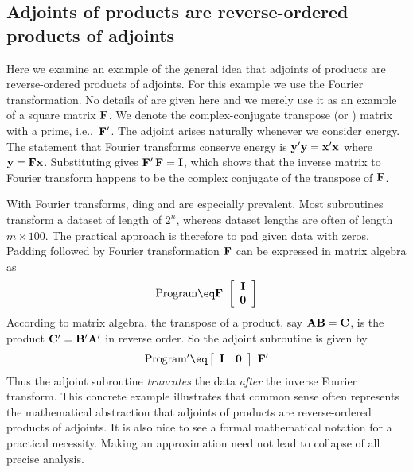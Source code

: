 \subsection{Adjoints of products are reverse-ordered products of adjoints}
Here we examine an example of the general idea that
adjoints of products are reverse-ordered products of adjoints.
For this example we use the Fourier transformation.
No details of  are given here
and we merely use it as an example of a square matrix $\bold F$.
We denote the complex-conjugate transpose (or ) matrix
with a prime,
i.e.,~$\bold F'$.
The adjoint arises naturally whenever we consider energy.
The statement that Fourier transforms conserve energy is
$\bold y'\bold y=\bold x'\bold x$ where $\bold y= \bold F \bold x$.
Substituting gives $\bold F'\, \bold F = \bold I$, which shows that
the inverse matrix to Fourier transform
happens to be the complex conjugate of the transpose of $\bold F$.
\par
With Fourier transforms,
ding and  are especially prevalent.
Most subroutines transform a dataset of length of $2^n$,
whereas dataset lengths are often of length $m \times 100$.
The practical approach is therefore to pad given data with zeros.
Padding followed by Fourier transformation $\bold F$
can be expressed in matrix algebra as
\begin{equation}
{\rm Program} \eq
\bold F \
 \left[
  \begin{array}{c}
   \bold I \\
   \bold 0
  \end{array}
 \right]
\end{equation}
According to matrix algebra, the transpose of a product,
say $\bold A \bold B = \bold C$,
is the product $\bold C' = \bold B' \bold A'$ in reverse order.
So the adjoint subroutine is given by
\begin{equation}
{\rm Program'} \eq
 \left[
  \begin{array}{cc}
   \bold I & \bold 0
  \end{array}
 \right]
\
\bold F'
\end{equation}
Thus the adjoint subroutine
{\it truncates} the data {\it after} the inverse Fourier transform.
This concrete example illustrates that common sense often represents
the mathematical abstraction
that adjoints of products are reverse-ordered products of adjoints.
It is also nice to see a formal mathematical notation
for a practical necessity.
Making an approximation need not lead to collapse of all precise analysis.


